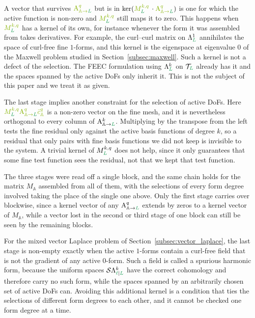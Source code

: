 \documentclass[a4paper, 12pt]{article}
\newcommand{\guidance}[1]{{\color{lime!70!black} #1}}
\newcommand{\green}{\color{ForestGreen}}
\newcommand{\T}{\mathcal{T}}
\renewcommand{\l}{{\green\ell}}
\renewcommand{\L}{{\green L}}
\newcommand{\freeVec}[3]{ {#1}^{#2}_{#3}}
\newcommand{\Amat}[3]{\mathbf{\mathrm{A}}^{#1}_{#2 \to #3}}
\newcommand{\FEECspace}[2]{\Lambda^{#1}_{#2}}
\newcommand{\SDFspace}[3]{\mathcal{S}\Lambda^{#1}_{#2 \vert #3}}
\newcommand{\activeDoFs}{\mathbb{A}}
\theoremstyle{definition}
\theoremstyle{plain}
\numberwithin{equation}{section}
\begin{document}
A vector that survives $\guidance{\Amat{q}{\activeDoFs}{\L}}$ but is in $\ker ( \guidance{M^{k,q}_\L} \, \cdot \guidance{\Amat{q}{\activeDoFs}{\L}} )$ is one for which the active function is non-zero and $\guidance{M^{k,q}_\L}$ still maps it to zero. This happens when $\guidance{M^{k,q}_\L}$ \guidance{has a kernel of its own}, for instance whenever the form it was assembled from takes derivatives. For example, the curl--curl matrix on $\FEECspace{1}{\L}$ annihilates the space of curl-free fine $1$-forms, and this kernel is the eigenspace at eigenvalue $0$ of the Maxwell problem studied in Section~\ref{subsec:maxwell}. Such a kernel is not a defect of the selection. The FEEC formulation using $\FEECspace{k}{\L}$ on $\T_\L$ already has it and the spaces spanned by the active DoFs only inherit it. This is not the subject of this paper and we treat it as given.

The last stage implies another constraint for the selection of active DoFs. Here $\guidance{M^{k,q}_\L \Amat{q}{\activeDoFs}{\L} \freeVec{\bar{c}}{q}{\activeDoFs}}$ is a non-zero vector on the fine mesh, and it is nevertheless orthogonal to every column of $\Amat{k}{\activeDoFs}{\L}$. Multiplying by the transpose from the left tests the fine residual only against the active basis functions \guidance{of degree $k$}, so a residual that only pairs with fine basis functions we did not keep is invisible to the system. \guidance{A trivial kernel of $M^{k,q}_\L$} does not help, since it only guarantees that some fine test function sees the residual, not that we kept that test function.

\guidance{The three stages were read off a single block, and the same chain holds for the matrix $M_{\activeDoFs}$ assembled from all of them, with the selections of every form degree involved taking the place of the single one above. Only the first stage carries over blockwise, since a kernel vector of any $\Amat{q}{\activeDoFs}{\L}$ extends by zeros to a kernel vector of $M_{\activeDoFs}$, while a vector lost in the second or third stage of one block can still be seen by the remaining blocks.}

For the mixed vector Laplace problem of Section~\ref{subsec:vector_laplace}, the last stage is non-empty exactly when the active $1$-forms contain a curl-free field that is not the gradient of any active $0$-form. Such a field is called a spurious harmonic form, because the uniform spaces $\SDFspace{k}{\l}{\L}$ have the correct cohomology and therefore carry no such form, while the spaces spanned by an arbitrarily chosen set of active DoFs can. Avoiding this additional kernel is a condition that ties the selections of different form degrees to each other, and it cannot be checked one form degree at a time.
\end{document}
